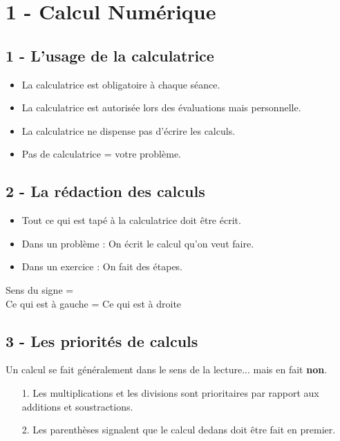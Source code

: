 



\section*{1 - Calcul Numérique}

\subsection*{1 - L'usage de la calculatrice}

\begin{itemize}[label={$\bullet$}]
  \item La calculatrice est obligatoire à chaque séance.
  \item La calculatrice est autorisée lors des évaluations mais personnelle.
  \item La calculatrice ne dispense pas d'écrire les calculs.
  \item Pas de calculatrice = votre problème.
\end{itemize}

\subsection*{2 - La rédaction des calculs}

\begin{itemize}[label={$\bullet$}]
  \item Tout ce qui est tapé à la calculatrice doit être écrit. 
  \item Dans un problème : On écrit le calcul qu'on veut faire.
  \item Dans un exercice : On fait des étapes.
\end{itemize}

\begin{Definition}{Sens du signe =}\\
  Ce qui est à gauche = Ce qui est à droite
\end{Definition}

\subsection*{3 - Les priorités de calculs}

Un calcul se fait généralement dans le sens de la lecture... mais en fait \textbf{non}.

\begin{enumerate}
  \item[1.] Les multiplications et les divisions sont prioritaires par rapport aux additions et soustractions.
  \item[2.] Les parenthèses signalent que le calcul dedans doit être fait en premier.  
\end{enumerate}

